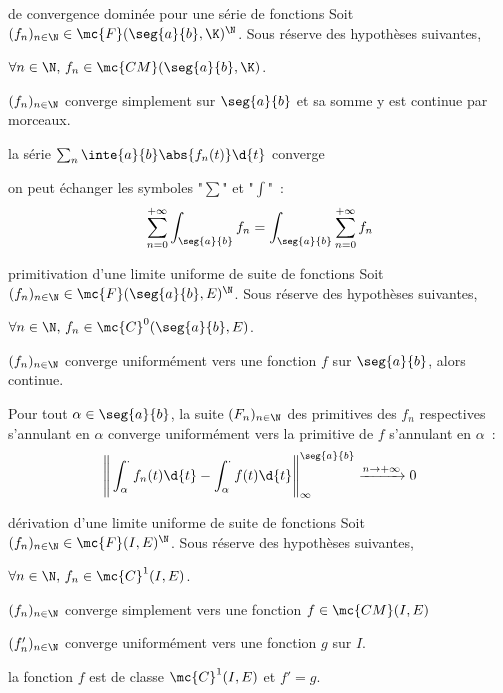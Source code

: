 \begin{adjustwidth}{-3cm}{-3cm}
\begin{theoreme}{10.63}{de convergence dominée pour une série de fonctions}
    Soit $(f_n)_{n \in \N} \in \mc{F}(\seg{a}{b},\K)^\N$. Sous réserve des hypothèses suivantes,
    \begin{enumeratebf}
        \item $\forall n \in \N,\, f_n \in \mc{CM}(\seg{a}{b},\K)$.
        \item $(f_n)_{n \in \N}$ converge simplement sur $\seg{a}{b}$ et sa somme y est continue par morceaux.
        \item la série $\sum_n \inte{a}{b}\abs{f_n(t)}\d{t}$ converge
    \end{enumeratebf}
    on peut échanger les symboles "$\sum$" et "$\int$"~:
    $$\sum_{n=0}^{+\infty} \int_{\seg{a}{b}} f_n = \int_{\seg{a}{b}} \sum_{n=0}^{+\infty} f_n $$
\end{theoreme}

\begin{theoreme}{10.66}{primitivation d'une limite uniforme de suite de fonctions}
    Soit $(f_n)_{n \in \N} \in \mc{F}(\seg{a}{b},E)^\N$. Sous réserve des hypothèses suivantes,
    \begin{enumeratebf}
        \item $\forall n \in \N,\, f_n \in \mc{C}^0(\seg{a}{b},E)$.
        \item $(f_n)_{n \in \N}$ converge uniformément vers une fonction $f$ sur $\seg{a}{b}$, alors continue.
    \end{enumeratebf}
    Pour tout $\alpha \in \seg{a}{b}$, la suite $(F_n)_{n \in \N}$ des primitives des $f_n$ respectives s'annulant en $\alpha$ converge uniformément vers la primitive de $f$ s'annulant en $\alpha$~:
    $$\Bigg\lVert\int_\alpha^\cdot f_n(t)\d{t} - \int_\alpha^\cdot f(t)\d{t}\Bigg\lVert_{\infty}^{\seg{a}{b}} \xrightarrow{n \to + \infty} 0$$
\end{theoreme}

\begin{theoreme}{10.66}{dérivation d'une limite uniforme de suite de fonctions}
    Soit $(f_n)_{n \in \N} \in \mc{F}(I,E)^\N$. Sous réserve des hypothèses suivantes,
    \begin{enumeratebf}
        \item $\forall n \in \N,\, f_n \in \mc{C}^1(I,E)$.
        \item $(f_n)_{n \in \N}$ converge simplement vers une fonction $f \in \mc{CM}(I,E)$
        \item $(f'_n)_{n \in \N}$ converge uniformément vers une fonction $g$ sur $I$.
    \end{enumeratebf}
    la fonction $f$ est de classe $\mc{C}^1(I,E)$ et $f' = g$.
\end{theoreme}


\end{adjustwidth}
